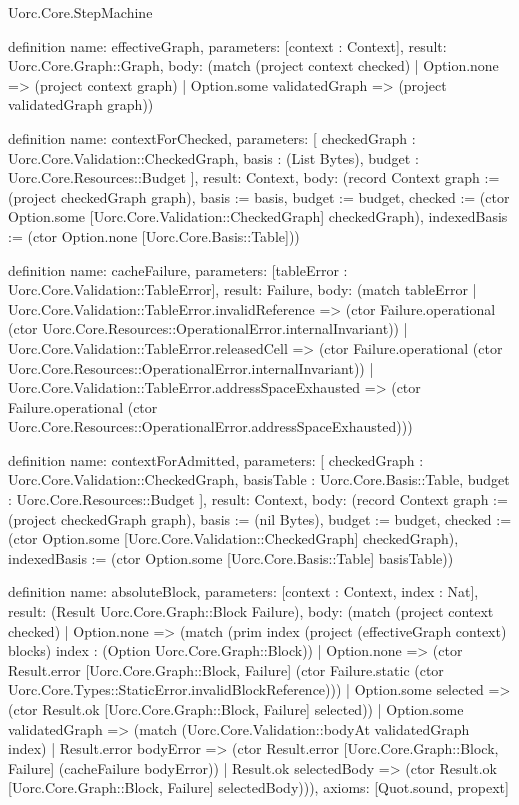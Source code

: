 \begin{lexlean}{Uorc.Core.StepMachine}
\begin{semanticmodule}
definition{
  name: effectiveGraph,
  parameters: [context : Context],
  result: Uorc.Core.Graph::Graph,
  body: (match (project context checked)
    | Option.none => (project context graph)
    | Option.some validatedGraph => (project validatedGraph graph))
}

definition{
  name: contextForChecked,
  parameters: [
    checkedGraph : Uorc.Core.Validation::CheckedGraph,
    basis : (List Bytes),
    budget : Uorc.Core.Resources::Budget
  ],
  result: Context,
  body: (record Context {graph := (project checkedGraph graph), basis := basis, budget := budget, checked := (ctor Option.some [Uorc.Core.Validation::CheckedGraph] checkedGraph), indexedBasis := (ctor Option.none [Uorc.Core.Basis::Table])})
}

definition{
  name: cacheFailure,
  parameters: [tableError : Uorc.Core.Validation::TableError],
  result: Failure,
  body: (match tableError
    | Uorc.Core.Validation::TableError.invalidReference => (ctor Failure.operational (ctor Uorc.Core.Resources::OperationalError.internalInvariant))
    | Uorc.Core.Validation::TableError.releasedCell => (ctor Failure.operational (ctor Uorc.Core.Resources::OperationalError.internalInvariant))
    | Uorc.Core.Validation::TableError.addressSpaceExhausted => (ctor Failure.operational (ctor Uorc.Core.Resources::OperationalError.addressSpaceExhausted)))
}

definition{
  name: contextForAdmitted,
  parameters: [
    checkedGraph : Uorc.Core.Validation::CheckedGraph,
    basisTable : Uorc.Core.Basis::Table,
    budget : Uorc.Core.Resources::Budget
  ],
  result: Context,
  body: (record Context {graph := (project checkedGraph graph), basis := (nil Bytes), budget := budget, checked := (ctor Option.some [Uorc.Core.Validation::CheckedGraph] checkedGraph), indexedBasis := (ctor Option.some [Uorc.Core.Basis::Table] basisTable)})
}

definition{
  name: absoluteBlock,
  parameters: [context : Context, index : Nat],
  result: (Result Uorc.Core.Graph::Block Failure),
  body: (match (project context checked)
    | Option.none => (match (prim index (project (effectiveGraph context) blocks) index : (Option Uorc.Core.Graph::Block))
      | Option.none => (ctor Result.error [Uorc.Core.Graph::Block, Failure] (ctor Failure.static (ctor Uorc.Core.Types::StaticError.invalidBlockReference)))
      | Option.some selected => (ctor Result.ok [Uorc.Core.Graph::Block, Failure] selected))
    | Option.some validatedGraph => (match (Uorc.Core.Validation::bodyAt validatedGraph index)
      | Result.error bodyError => (ctor Result.error [Uorc.Core.Graph::Block, Failure] (cacheFailure bodyError))
      | Result.ok selectedBody => (ctor Result.ok [Uorc.Core.Graph::Block, Failure] selectedBody))),
  axioms: [Quot.sound, propext]
}


\end{semanticmodule}
\end{lexlean}
